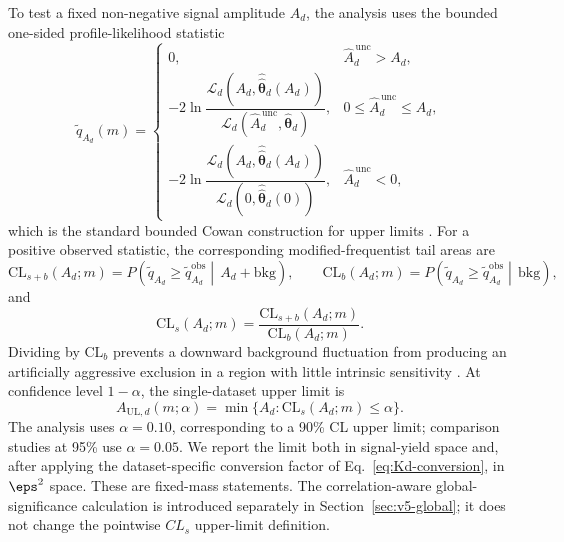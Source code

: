 To test a fixed non-negative signal amplitude $A_d$, the analysis uses
the bounded one-sided profile-likelihood statistic
\begin{equation}
\tilde q_{A_d}(m)=
\begin{cases}
0, &
\hat A_d^{\,\mathrm{unc}} > A_d, \\
-2\ln
\dfrac{\mathcal{L}_d\!\left(A_d,\hat{\hat{\bm{\theta}}}_d(A_d)\right)}
{\mathcal{L}_d\!\left(\hat A_d^{\,\mathrm{unc}},\hat{\bm{\theta}}_d\right)}, &
0\le \hat A_d^{\,\mathrm{unc}}\le A_d, \\
-2\ln
\dfrac{\mathcal{L}_d\!\left(A_d,\hat{\hat{\bm{\theta}}}_d(A_d)\right)}
{\mathcal{L}_d\!\left(0,\hat{\hat{\bm{\theta}}}_d(0)\right)}, &
\hat A_d^{\,\mathrm{unc}} < 0,
\end{cases}
\label{eq:qmu-single}
\end{equation}
which is the standard bounded Cowan construction for upper limits \cite{Cowan2011}.
For a positive observed statistic, the corresponding modified-frequentist tail areas are
\begin{equation}
\mathrm{CL}_{s+b}(A_d;m)
=
P\!\left(
\tilde q_{A_d}\ge \tilde q_{A_d}^{\mathrm{obs}}
\middle|\,
A_d+\mathrm{bkg}
\right),
\qquad
\mathrm{CL}_{b}(A_d;m)
=
P\!\left(
\tilde q_{A_d}\ge \tilde q_{A_d}^{\mathrm{obs}}
\middle|\,
\mathrm{bkg}
\right),
\end{equation}
and
\begin{equation}
\mathrm{CL}_{s}(A_d;m)=
\frac{\mathrm{CL}_{s+b}(A_d;m)}{\mathrm{CL}_{b}(A_d;m)}.
\label{eq:cls-definition}
\end{equation}
Dividing by $\mathrm{CL}_b$ prevents a downward background fluctuation from producing
an artificially aggressive exclusion in a region with little intrinsic sensitivity
\cite{Junk1999,Read2002}. At confidence level $1-\alpha$, the single-dataset upper
limit is
\begin{equation}
A_{\mathrm{UL},d}(m;\alpha)
=\min\{A_d:\mathrm{CL}_s(A_d;m)\le\alpha\}.
\label{eq:aul-single}
\end{equation}
The analysis uses $\alpha=0.10$, corresponding to a 90\% CL upper limit; comparison
studies at 95\% use $\alpha=0.05$. We report the limit both in
signal-yield space and, after applying the dataset-specific conversion factor of
Eq.~\eqref{eq:Kd-conversion}, in $\eps^2$ space.
These are fixed-mass statements. The correlation-aware global-significance
calculation is introduced separately in Section~\ref{sec:v5-global}; it does
not change the pointwise $CL_s$ upper-limit definition.


